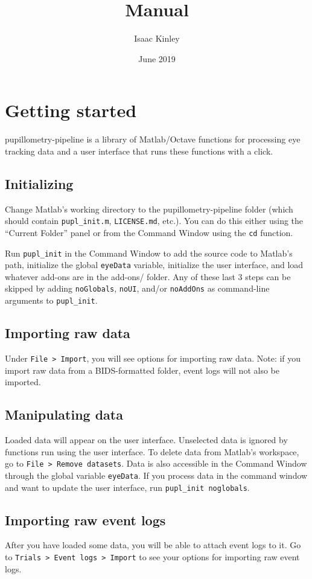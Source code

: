 \documentclass{article}
\title{Manual}
\author{Isaac Kinley}
\date{June 2019}
\begin{document}
\maketitle
\tableofcontents

\section{Getting started}
pupillometry-pipeline is a library of Matlab/Octave functions for processing eye tracking data and a user interface that runs these functions with a click.

\subsection{Initializing}
Change Matlab's working directory to the pupillometry-pipeline folder (which should contain \texttt{pupl\_init.m}, \texttt{LICENSE.md}, etc.). You can do this either using the ``Current Folder'' panel or from the Command Window using the \texttt{cd} function.

Run \texttt{pupl\_init} in the Command Window to add the source code to Matlab's path, initialize the global \texttt{eyeData} variable, initialize the user interface, and load whatever add-ons are in the add-ons/ folder. Any of these last 3 steps can be skipped by adding \texttt{noGlobals}, \texttt{noUI}, and/or \texttt{noAddOns} as command-line arguments to \texttt{pupl\_init}.

\subsection{Importing raw data}
Under \texttt{File > Import}, you will see options for importing raw data. Note: if you import raw data from a BIDS-formatted folder, event logs will not also be imported.

\subsection{Manipulating data}
Loaded data will appear on the user interface. Unselected data is ignored by functions run using the user interface. To delete data from Matlab's workspace, go to \texttt{File > Remove datasets}. Data is also accessible in the Command Window through the global variable \texttt{eyeData}. If you process data in the command window and want to update the user interface, run \texttt{pupl\_init noglobals}.

\subsection{Importing raw event logs}
After you have loaded some data, you will be able to attach event logs to it. Go to \texttt{Trials > Event logs > Import} to see your options for importing raw event logs.
\end{document}
